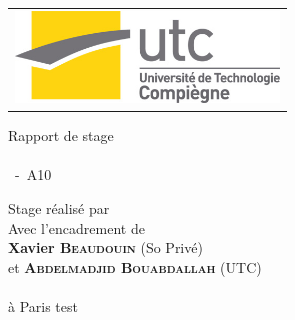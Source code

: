 \begin{titlepage}
 \begin{multicols}{2}
  \begin{flushleft}
   \begin{tabular}[l]{lrl}
    \multicolumn{3}{c}{
     \includegraphics[width=7cm]{img/logo_utc}
    } \\
   \end{tabular}
  \end{flushleft}

 \end{multicols}

 \begin{center}
  \vspace{120pt}
  \LARGE
	Rapport de stage \uvname \\
  \vspace{20pt}
  \Huge
   \textbf{\subjectname} \\
  \vspace{20pt}
  \Large
   \authorname ~-~A10
 \end{center}

 \vspace{160pt}
 \begin{flushright}
  \normalsize
	Stage réalisé par \textbf{\authorname} \\
	Avec l'encadrement de \\
	\textbf{Xavier \textsc{Beaudouin}} (So Privé)\\
	et \textbf{\textsc{Abdelmadjid Bouabdallah}} (UTC) \\
	\thedate \\
	à Paris
	test\cite{rfc_3442}
 \end{flushright}
\end{titlepage}


\setcounter{page}{0}
\thispagestyle{empty}
\mbox{}
\newpage

